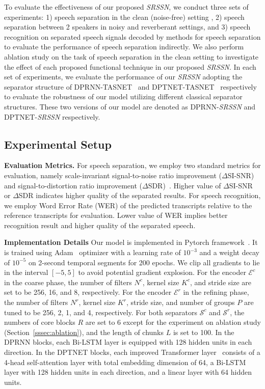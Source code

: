 To evaluate the effectiveness of our proposed \emph{SRSSN}, we conduct three sets of experiments: 1) speech separation in the clean (noise-free) setting , 2) speech separation between 2 speakers in noisy and reverberant settings, and 3) speech recognition on separated speech signals decoded by methods for speech separation to evaluate the performance of speech separation indirectly. We also perform ablation study on the task of speech separation in the clean setting to investigate the effect of each proposed functional technique in our proposed \emph{SRSSN}. In each set of experiments, we evaluate the performance of our \emph{SRSSN} adopting the separator structure of DPRNN-TASNET~\cite{DPRNN} and DPTNET-TASNET~\cite{DPTNet} respectively to evaluate the robustness of our model utilizing different classical separator structures. These two versions of our model are denoted as DPRNN-\emph{SRSSN} and DPTNET-\emph{SRSSN} respectively.

\subsection{Experimental Setup}
\noindent\textbf{Evaluation Metrics.} 
For speech separation, we employ two standard metrics for evaluation, namely scale-invariant signal-to-noise ratio improvement ($\Delta$SI-SNR)~\cite{SISNR} and signal-to-distortion ratio improvement ($\Delta$SDR)~\cite{SDR}. Higher value of $\Delta$SI-SNR or $\Delta$SDR indicates higher quality of the separated results. For speech recognition, we employ Word Error Rate (WER) of the predicted transcripts relative to the reference transcripts for evaluation. Lower value of WER implies better recognition result and higher quality of the separated speech. 

\noindent\textbf{Implementation Details}
Our model is implemented in Pytorch framework~\cite{pytorch}. It is trained using Adam~\cite{adam} optimizer with a learning rate of $10^{-3}$ and a weight decay of $10^{-5}$ on 2-second temporal segments for 200 epochs. We clip all gradients to lie in the interval $[-5, 5]$ to avoid potential gradient explosion.
For the encoder $\mathcal{E}^c$ in the coarse phase, the number of filters $N^c$, kernel size $K^c$, and stride size are set to be 256, 16, and 8, respectively.
For the encoder $\mathcal{E}^r$ in the refining phase, the number of filters $N^r$, kernel size $K^r$, stride size, and number of groups $P$ are tuned to be 256, 2, 1, and 4, respectively. For both separators $\mathcal{S}^c$ and $\mathcal{S}^r$, the numbers of core blocks $R$ are set to 6 except for the experiment on ablation study (Section~\ref{sssec:ablation}), and the length of chunks $L$ is set to 100.
In the DPRNN blocks, each Bi-LSTM layer is equipped with 128 hidden units in each direction. 
In the DPTNET blocks, each improved Transformer layer~\cite{DPTNet} consists of a 4-head self-attention layer with total embedding dimension of 64, a Bi-LSTM layer with 128 hidden units in each direction, and a linear layer with 64 hidden units.



